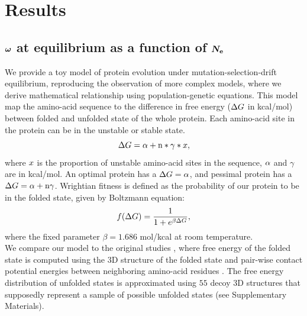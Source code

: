 \documentclass{article}
\begin{document}
\section{Results}
\subsection{$\bm{\omega}$ at equilibrium as a function of $\bm{N_{\mathrm{e}}}$}

We provide a toy model of protein evolution under mutation-selection-drift equilibrium, reproducing the observation of more complex models, where we derive mathematical relationship using population-genetic equations. 
This model map the amino-acid sequence to the difference in free energy ($\Delta G$ in kcal/mol) between folded and unfolded state of the whole protein.
Each amino-acid site in the protein can be in the unstable or stable state.
\begin{equation}
\Delta G = \alpha + \text{n} * \gamma * x, 
\end{equation}
where $x$ is the proportion of unstable amino-acid sites in the sequence, $\alpha$ and $\gamma$ are in kcal/mol.
An optimal protein has a $\Delta G = \alpha$, and pessimal protein has a $\Delta G = \alpha + \text{n} \gamma$.
Wrightian fitness is defined as the probability of our protein to be in the folded state, given by Boltzmann equation: 
\begin{equation}
f(\Delta G) = \dfrac{1}{1 + e^{\beta \Delta G }}, 
\end{equation}
where the fixed parameter $\beta=1.686$ mol/kcal at room temperature.\\

We compare our model to the original studies \cite{Williams2006, Goldstein2011, Pollock2012}, where free energy of the folded state is computed using the $3$D structure of the folded state and pair-wise contact potential energies between neighboring amino-acid residues \cite{Miyazawa1985}.
The free energy distribution of unfolded states is approximated using $55$ decoy $3$D structures that supposedly represent a sample of possible unfolded states (see Supplementary Materials).
\end{document}

